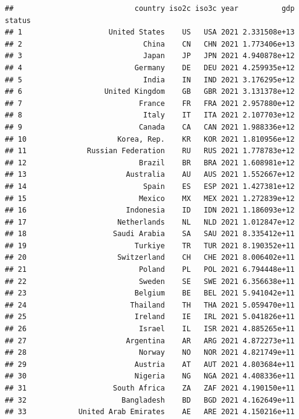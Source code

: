 \documentclass[
]{article}
\begin{document}
\begin{verbatim}
##                            country iso2c iso3c year          gdp status
## 1                    United States    US   USA 2021 2.331508e+13       
## 2                            China    CN   CHN 2021 1.773406e+13       
## 3                            Japan    JP   JPN 2021 4.940878e+12       
## 4                          Germany    DE   DEU 2021 4.259935e+12       
## 5                            India    IN   IND 2021 3.176295e+12       
## 6                   United Kingdom    GB   GBR 2021 3.131378e+12       
## 7                           France    FR   FRA 2021 2.957880e+12       
## 8                            Italy    IT   ITA 2021 2.107703e+12       
## 9                           Canada    CA   CAN 2021 1.988336e+12       
## 10                     Korea, Rep.    KR   KOR 2021 1.810956e+12       
## 11              Russian Federation    RU   RUS 2021 1.778783e+12       
## 12                          Brazil    BR   BRA 2021 1.608981e+12       
## 13                       Australia    AU   AUS 2021 1.552667e+12       
## 14                           Spain    ES   ESP 2021 1.427381e+12       
## 15                          Mexico    MX   MEX 2021 1.272839e+12       
## 16                       Indonesia    ID   IDN 2021 1.186093e+12       
## 17                     Netherlands    NL   NLD 2021 1.012847e+12       
## 18                    Saudi Arabia    SA   SAU 2021 8.335412e+11       
## 19                         Turkiye    TR   TUR 2021 8.190352e+11       
## 20                     Switzerland    CH   CHE 2021 8.006402e+11       
## 21                          Poland    PL   POL 2021 6.794448e+11       
## 22                          Sweden    SE   SWE 2021 6.356638e+11       
## 23                         Belgium    BE   BEL 2021 5.941042e+11       
## 24                        Thailand    TH   THA 2021 5.059470e+11       
## 25                         Ireland    IE   IRL 2021 5.041826e+11       
## 26                          Israel    IL   ISR 2021 4.885265e+11       
## 27                       Argentina    AR   ARG 2021 4.872273e+11       
## 28                          Norway    NO   NOR 2021 4.821749e+11       
## 29                         Austria    AT   AUT 2021 4.803684e+11       
## 30                         Nigeria    NG   NGA 2021 4.408336e+11       
## 31                    South Africa    ZA   ZAF 2021 4.190150e+11       
## 32                      Bangladesh    BD   BGD 2021 4.162649e+11       
## 33            United Arab Emirates    AE   ARE 2021 4.150216e+11       

\end{verbatim}
\end{document}
